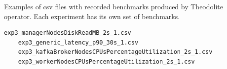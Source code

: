 Examples of csv files with recorded benchmarks produced by Theodolite operator.
Each experiment has its own set of benchmarks.

\begin{lstlisting}[label={lst:bench-csv-files}]
    exp3_managerNodesDiskReadMB_2s_1.csv
    exp3_generic_latency_p90_30s_1.csv
    exp3_kafkaBrokerNodesCPUsPercentageUtilization_2s_1.csv
    exp3_workerNodesCPUsPercentageUtilization_2s_1.csv
\end{lstlisting}


%
